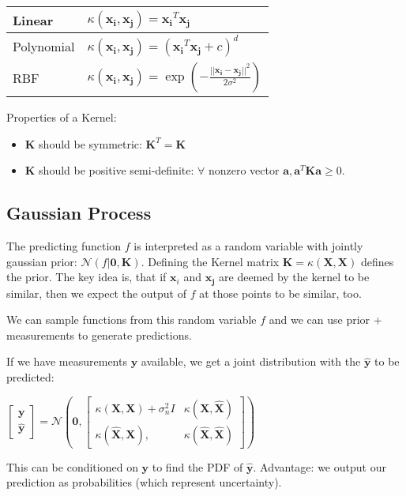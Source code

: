 \documentclass[10pt,a4paper,landscape]{article}
\renewcommand{\bf}[1]{\ensuremath{\mathbf{#1}}}
\begin{document}
\begin{multicols*}{4}
\begin{tabular}{ l | l }
  \hline
  Linear     & $\kappa(\bf{x_i}, \bf{x_j}) = \bf{x_i}^T \bf{x_j}$ \\
  \hline
  Polynomial & $\kappa(\bf{x_i}, \bf{x_j}) = (\bf{x_i}^T \bf{x_j} + c)^d$ \\
  \hline
  RBF        & $\kappa(\bf{x_i}, \bf{x_j}) = \exp\left(-\frac{||\bf{x_i} - \bf{x_j}||^2}{2\sigma^2}\right)$ \\
  \hline
\end{tabular}

Properties of a Kernel:
\begin{itemize}
\item $\bf{K}$ should be symmetric: $\bf{K}^T = \bf{K}$
\item $\bf{K}$ should be positive semi-definite: $\forall$ nonzero vector $\bf{a}, \bf{a}^T \bf{K} \bf{a} \geq 0$.
\end{itemize}

\subsection{Gaussian Process}
The predicting function $f$ is interpreted as a random variable with jointly gaussian prior: $\mathcal{N}(f | \bf{0}, \bf{K})$.
Defining the Kernel matrix $\bf{K} = \kappa(\bf{X}, \bf{X})$ defines the prior. The key idea is, that if $\bf{x}_i$ and $\bf{x_j}$ are
deemed by the kernel to be similar, then we expect the output of $f$ at those points to be similar, too.

We can sample functions from this random variable $f$ and we can use prior + measurements to generate predictions.

If we have measurements $\bf{y}$ available, we get a joint distribution with the $\bf{\hat{y}}$ to be predicted:

$
\begin{bmatrix}
  \bf{y} \\
  \bf{\hat{y}}
\end{bmatrix}
=
\mathcal{N} \left(
  \bf{0},
  \begin{bmatrix}
    \kappa(\bf{X}, \bf{X}) + \sigma_n^2 I  & \kappa(\bf{X}, \bf{\hat{X}}) \\
    \kappa(\bf{\hat{X}}, \bf{X}),          & \kappa(\bf{\hat{X}}, \bf{\hat{X}})
  \end{bmatrix}
\right)
$

This can be conditioned on $\bf{y}$ to find the PDF of $\bf{\hat{y}}$. Advantage: we output our prediction as probabilities (which represent uncertainty).


\end{multicols*}
\end{document}
